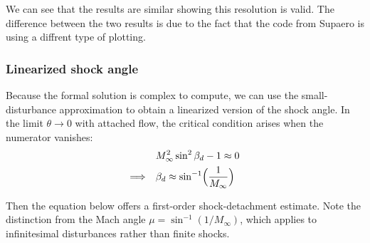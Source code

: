 We can see that the results are similar showing this resolution is valid. The difference between the two results is due to the fact that the code from Supaero is using a diffrent type of plotting.

\subsubsection{Linearized shock angle}
Because the formal solution is complex to compute, we can use the small-disturbance approximation to obtain a linearized version of the shock angle. In the limit \(\theta\to0\) with attached flow, the critical condition arises when the numerator vanishes:
\begin{align}
	&M_\infty^2\sin^2\beta_d - 1 \approx 0\\
	\Longrightarrow \quad &\beta_d \approx \sin^{-1}\Bigl(\frac{1}{M_\infty}\Bigr)
\end{align}
\label{eq:beta_d}

Then the equation below offers a first-order shock-detachment estimate. Note the distinction from the Mach angle \(\mu=\sin^{-1}(1/M_\infty)\), which applies to infinitesimal disturbances rather than finite shocks.


